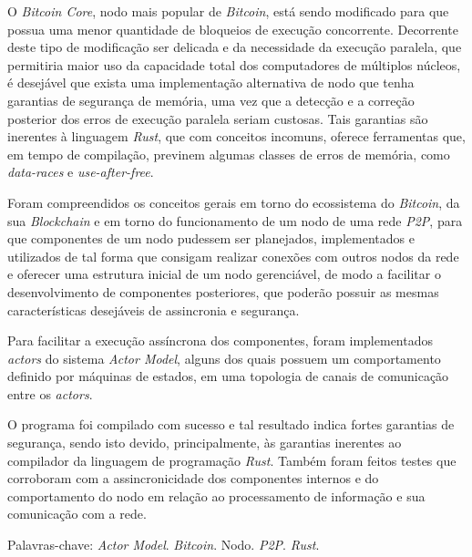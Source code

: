 \begin{resumo}
O \textit{Bitcoin Core}, nodo mais popular de \textit{Bitcoin}, está sendo modificado para que possua uma menor quantidade de bloqueios de execução concorrente. Decorrente deste tipo de modificação ser delicada e da necessidade da execução paralela, que permitiria maior uso da capacidade total dos computadores de múltiplos núcleos, é desejável que exista uma implementação alternativa de nodo que tenha garantias de segurança de memória, uma vez que a detecção e a correção posterior dos erros de execução paralela seriam custosas. Tais garantias são inerentes à linguagem \textit{Rust}, que com conceitos incomuns, oferece ferramentas que, em tempo de compilação, previnem algumas classes de erros de memória, como \textit{data-races} e \textit{use-after-free}.

Foram compreendidos os conceitos gerais em torno do ecossistema do \textit{Bitcoin}, da sua \textit{Blockchain} e em torno do funcionamento de um nodo de uma rede \textit{P2P}, para que componentes de um nodo pudessem ser planejados, implementados e utilizados de tal forma que consigam realizar conexões com outros nodos da rede e oferecer uma estrutura inicial de um nodo gerenciável, de modo a facilitar o desenvolvimento de componentes posteriores, que poderão possuir as mesmas características desejáveis de assincronia e segurança.

Para facilitar a execução assíncrona dos componentes, foram implementados \textit{actors} do sistema \textit{Actor Model}, alguns dos quais possuem um comportamento definido por máquinas de estados, em uma topologia de canais de comunicação entre os \textit{actors}.

O programa foi compilado com sucesso e tal resultado indica fortes garantias de segurança, sendo isto devido, principalmente, às garantias inerentes ao compilador da linguagem de programação \textit{Rust}. Também foram feitos testes que corroboram com a assincronicidade dos componentes internos e do comportamento do nodo em relação ao processamento de informação e sua comunicação com a rede.

Palavras-chave: \textit{Actor Model}. \textit{Bitcoin}. Nodo. \textit{P2P}. \textit{Rust}.
\end{resumo}

